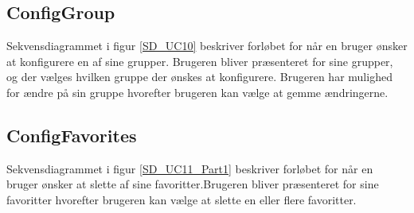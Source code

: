 
\subsection*{ConfigGroup}
Sekvensdiagrammet i figur \ref{SD_UC10} beskriver forløbet for når en bruger ønsker at konfigurere en af sine grupper. Brugeren bliver præsenteret for sine grupper, og der vælges hvilken gruppe der ønskes at konfigurere. Brugeren har mulighed for ændre på sin gruppe hvorefter brugeren kan vælge at gemme ændringerne.


\subsection*{ConfigFavorites}
Sekvensdiagrammet i figur \ref{SD_UC11_Part1} beskriver forløbet for når en bruger ønsker at slette af sine favoritter.Brugeren bliver præsenteret for sine favoritter hvorefter brugeren kan vælge at slette en eller flere favoritter.

